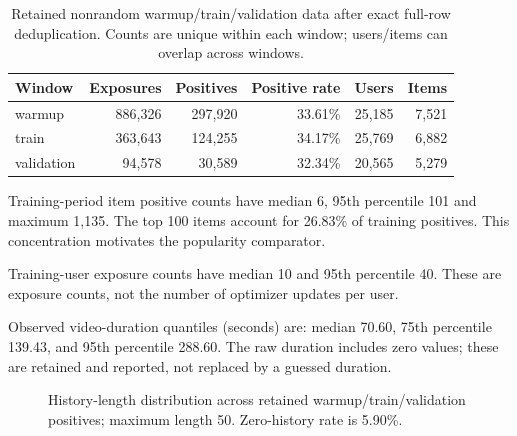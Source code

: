 \documentclass[11pt,a4paper]{article}
\begin{document}
\begin{table}[H]\centering\small
\begin{tabular}{lrrrrr}\toprule
Window & Exposures & Positives & Positive rate & Users & Items\\\midrule
warmup & 886,326 & 297,920 & 33.61\% & 25,185 & 7,521 \\
train & 363,643 & 124,255 & 34.17\% & 25,769 & 6,882 \\
validation & 94,578 & 30,589 & 32.34\% & 20,565 & 5,279 \\
\bottomrule\end{tabular}\caption{Retained nonrandom warmup/train/validation data after exact full-row deduplication. Counts are unique within each window; users/items can overlap across windows.}\end{table}

Training-period item positive counts have median 6, 95th percentile 101 and maximum 1,135. The top 100 items account for 26.83\% of training positives. This concentration motivates the popularity comparator.

Training-user exposure counts have median 10 and 95th percentile 40. These are exposure counts, not the number of optimizer updates per user.

Observed video-duration quantiles (seconds) are: median 70.60, 75th percentile 139.43, and 95th percentile 288.60. The raw duration includes zero values; these are retained and reported, not replaced by a guessed duration.
\begin{figure}[H]\centering
{}\caption{History-length distribution across retained warmup/train/validation positives; maximum length 50. Zero-history rate is 5.90\%.}\end{figure}
\clearpage
\end{document}
